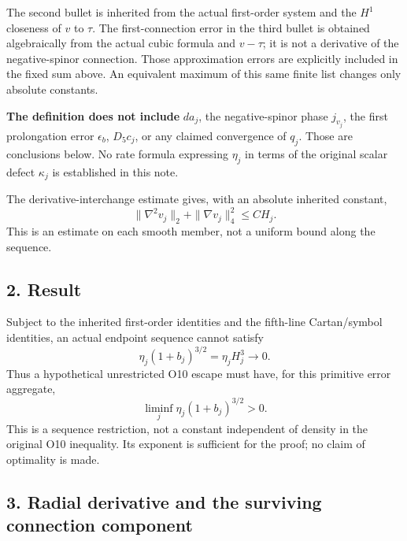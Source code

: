\documentclass[
]{article}
\begin{document}
The second bullet is inherited from the actual first-order system and
the \(H^1\) closeness of \(v\) to \(\tau\). The first-connection error
in the third bullet is obtained algebraically from the actual cubic
formula and \(v-\tau\); it is not a derivative of the negative-spinor
connection. Those approximation errors are explicitly included in the
fixed sum above. An equivalent maximum of this same finite list changes
only absolute constants.

\textbf{The definition does not include} \(da_j\), the negative-spinor
phase \(j_{v_j}\), the first prolongation error \(\epsilon_b\),
\(D_5c_j\), or any claimed convergence of \(q_j\). Those are conclusions
below. No rate formula expressing \(\eta_j\) in terms of the original
scalar defect \(\kappa_j\) is established in this note.

The derivative-interchange estimate gives, with an absolute inherited
constant, \[
 \|\nabla^2v_j\|_2+\|\nabla v_j\|_4^2\le C H_j. \tag{1}
\] This is an estimate on each smooth member, not a uniform bound along
the sequence.

\hypertarget{result}{%
\subsection{2. Result}\label{result}}

Subject to the inherited first-order identities and the fifth-line
Cartan/symbol identities, an actual endpoint sequence cannot satisfy \[
 \boxed{\eta_j(1+b_j)^{3/2}=\eta_j H_j^3\longrightarrow0.} \tag{2}
\] Thus a hypothetical unrestricted O10 escape must have, for this
primitive error aggregate, \[
 \liminf_j\eta_j(1+b_j)^{3/2}>0. \tag{3}
\] This is a sequence restriction, not a constant independent of density
in the original O10 inequality. Its exponent is sufficient for the
proof; no claim of optimality is made.

\hypertarget{radial-derivative-and-the-surviving-connection-component}{%
\subsection{3. Radial derivative and the surviving connection
component}\label{radial-derivative-and-the-surviving-connection-component}}
\end{document}
